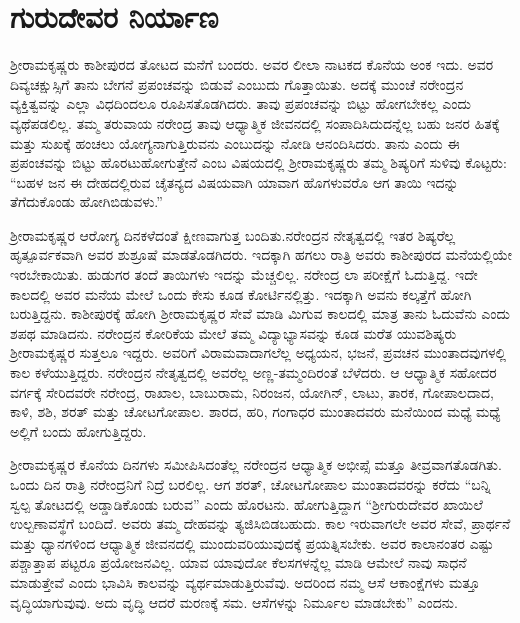 
\chapter{ಗುರುದೇವರ ನಿರ್ಯಾಣ}

ಶ‍್ರೀರಾಮಕೃಷ್ಣರು ಕಾಶೀಪುರದ ತೋಟದ ಮನೆಗೆ ಬಂದರು. ಅವರ ಲೀಲಾ ನಾಟಕದ ಕೊನೆಯ ಅಂಕ ಇದು. ಅವರ ದಿವ್ಯಚಕ್ಷುಸ್ಸಿಗೆ ತಾನು ಬೇಗನೆ ಪ್ರಪಂಚವನ್ನು ಬಿಡುವೆ ಎಂಬುದು ಗೊತ್ತಾಯಿತು. ಅದಕ್ಕೆ ಮುಂಚೆ ನರೇಂದ್ರನ ವ್ಯಕ್ತಿತ್ವವನ್ನು ಎಲ್ಲಾ ವಿಧದಿಂದಲೂ ರೂಪಿಸತೊಡಗಿದರು. ತಾವು ಪ್ರಪಂಚವನ್ನು ಬಿಟ್ಟು ಹೋಗಬೇಕಲ್ಲ ಎಂದು ವ್ಯಥೆಪಡಲಿಲ್ಲ. ತಮ್ಮ ತರುವಾಯ ನರೇಂದ್ರ ತಾವು ಆಧ್ಯಾತ್ಮಿಕ ಜೀವನದಲ್ಲಿ ಸಂಪಾದಿಸಿದುದನ್ನೆಲ್ಲ ಬಹು ಜನರ ಹಿತಕ್ಕೆ ಮತ್ತು ಸುಖಕ್ಕೆ ಹಂಚಲು ಯೋಗ್ಯನಾಗುತ್ತಿರುವನು ಎಂಬುದನ್ನು ನೋಡಿ ಆನಂದಿಸಿದರು. ತಾನು ಎಂದು ಈ ಪ್ರಪಂಚವನ್ನು ಬಿಟ್ಟು ಹೊರಟುಹೋಗುತ್ತೇನೆ ಎಂಬ ವಿಷಯದಲ್ಲಿ ಶ‍್ರೀರಾಮಕೃಷ್ಣರು ತಮ್ಮ ಶಿಷ್ಯರಿಗೆ ಸುಳಿವು ಕೊಟ್ಟರು: “ಬಹಳ ಜನ ಈ ದೇಹದಲ್ಲಿರುವ ಚೈತನ್ಯದ ವಿಷಯವಾಗಿ ಯಾವಾಗ ಹೊಗಳುವರೊ ಆಗ ತಾಯಿ ಇದನ್ನು ತೆಗೆದುಕೊಂಡು ಹೋಗಿಬಿಡುವಳು.”

\newpage

ಶ‍್ರೀರಾಮಕೃಷ್ಣರ ಆರೋಗ್ಯ ದಿನಕಳೆದಂತೆ ಕ್ಷೀಣವಾಗುತ್ತ ಬಂದಿತು.ನರೇಂದ್ರನ ನೇತೃತ್ವದಲ್ಲಿ ಇತರ ಶಿಷ್ಯರೆಲ್ಲ ಹೃತ್ಪೂರ್ವಕವಾಗಿ ಅವರ ಶುಶ್ರೂಷೆ ಮಾಡತೊಡಗಿದರು. ಇದಕ್ಕಾಗಿ ಹಗಲು ರಾತ್ರಿ ಅವರು ಕಾಶೀಪುರದ ಮನೆಯಲ್ಲಿಯೇ ಇರಬೇಕಾಯಿತು. ಹುಡುಗರ ತಂದೆ ತಾಯಿಗಳು ಇದನ್ನು ಮೆಚ್ಚಲಿಲ್ಲ. ನರೇಂದ್ರ ಲಾ ಪರೀಕ್ಷೆಗೆ ಓದುತ್ತಿದ್ದ. ಇದೇ ಕಾಲದಲ್ಲಿ ಅವರ ಮನೆಯ ಮೇಲೆ ಒಂದು ಕೇಸು ಕೂಡ ಕೋರ್ಟಿನಲ್ಲಿತ್ತು. ಇದಕ್ಕಾಗಿ ಅವನು ಕಲ್ಕತ್ತೆಗೆ ಹೋಗಿ ಬರುತ್ತಿದ್ದನು. ಕಾಶೀಪುರಕ್ಕೆ ಹೋಗಿ ಶ‍್ರೀರಾಮಕೃಷ್ಣರ ಸೇವೆ ಮಾಡಿ ಮಿಗುವ ಕಾಲದಲ್ಲಿ ಮಾತ್ರ ತಾನು ಓದುವೆನು ಎಂದು ಶಪಥ ಮಾಡಿದನು. ನರೇಂದ್ರನ ಕೋರಿಕೆಯ ಮೇಲೆ ತಮ್ಮ ವಿದ್ಯಾಭ್ಯಾಸವನ್ನು ಕೂಡ ಮರೆತ ಯುವಶಿಷ್ಯರು ಶ‍್ರೀರಾಮಕೃಷ್ಣರ ಸುತ್ತಲೂ ಇದ್ದರು. ಅವರಿಗೆ ವಿರಾಮವಾದಾಗಲೆಲ್ಲ ಅಧ್ಯಯನ, ಭಜನೆ, ಪ್ರವಚನ ಮುಂತಾದವುಗಳಲ್ಲಿ ಕಾಲ ಕಳೆಯುತ್ತಿದ್ದರು. ನರೇಂದ್ರನ ನೇತೃತ್ವದಲ್ಲಿ ಅವರೆಲ್ಲ ಅಣ್ಣ-ತಮ್ಮಂದಿರಂತೆ ಬೆಳೆದರು. ಆ ಆಧ್ಯಾತ್ಮಿಕ ಸಹೋದರ ವರ್ಗಕ್ಕೆ ಸೇರಿದವರೇ ನರೇಂದ್ರ, ರಾಖಾಲ, ಬಾಬುರಾಮ, ನಿರಂಜನ, ಯೋಗಿನ್, ಲಾಟು, ತಾರಕ, ಗೋಪಾಲದಾದ, ಕಾಳಿ, ಶಶಿ, ಶರತ್ ಮತ್ತು ಚೋಟಗೋಪಾಲ. ಶಾರದ, ಹರಿ, ಗಂಗಾಧರ ಮುಂತಾದವರು ಮನೆಯಿಂದ ಮಧ್ಯೆ ಮಧ್ಯೆ ಅಲ್ಲಿಗೆ ಬಂದು ಹೋಗುತ್ತಿದ್ದರು.

ಶ‍್ರೀರಾಮಕೃಷ್ಣರ ಕೊನೆಯ ದಿನಗಳು ಸಮೀಪಿಸಿದಂತೆಲ್ಲ ನರೇಂದ್ರನ ಆಧ್ಯಾತ್ಮಿಕ ಅಭೀಪ್ಸೆ ಮತ್ತೂ ತೀವ್ರವಾಗತೊಡಗಿತು. ಒಂದು ದಿನ ರಾತ್ರಿ ನರೇಂದ್ರನಿಗೆ ನಿದ್ರೆ ಬರಲಿಲ್ಲ. ಆಗ ಶರತ್, ಚೋಟಗೋಪಾಲ ಮುಂತಾದವರನ್ನು ಕರೆದು “ಬನ್ನಿ ಸ್ವಲ್ಪ ತೋಟದಲ್ಲಿ ಅಡ್ಡಾಡಿಕೊಂಡು ಬರುವ” ಎಂದು ಹೊರಟನು. ಹೋಗುತ್ತಿದ್ದಾಗ “ಶ‍್ರೀಗುರುದೇವರ ಖಾಯಿಲೆ ಉಲ್ಬಣಾವಸ್ಥೆಗೆ ಬಂದಿದೆ. ಅವರು ತಮ್ಮ ದೇಹವನ್ನು ತ್ಯಜಿಸಿಬಿಡಬಹುದು. ಕಾಲ ಇರುವಾಗಲೇ ಅವರ ಸೇವೆ, ಪ್ರಾರ್ಥನೆ ಮತ್ತು ಧ್ಯಾನಗಳಿಂದ ಆಧ್ಯಾತ್ಮಿಕ ಜೀವನದಲ್ಲಿ ಮುಂದುವರಿಯುವುದಕ್ಕೆ ಪ್ರಯತ್ನಿಸಬೇಕು. ಅವರ ಕಾಲಾನಂತರ ಎಷ್ಟು ಪಶ್ಚಾತ್ತಾಪ ಪಟ್ಟರೂ ಪ್ರಯೋಜನವಿಲ್ಲ. ಯಾವ ಯಾವುದೋ ಕೆಲಸಗಳನ್ನೆಲ್ಲ ಮಾಡಿ ಆಮೇಲೆ ನಾವು ಸಾಧನೆ ಮಾಡುತ್ತೇವೆ ಎಂದು ಭಾವಿಸಿ ಕಾಲವನ್ನು ವ್ಯರ್ಥಮಾಡುತ್ತಿರುವೆವು. ಅದರಿಂದ ನಮ್ಮ ಆಸೆ ಆಕಾಂಕ್ಷೆಗಳು ಮತ್ತೂ ವೃದ್ಧಿಯಾಗುವುವು. ಅದು ವೃದ್ಧಿ ಆದರೆ ಮರಣಕ್ಕೆ ಸಮ. ಆಸೆಗಳನ್ನು ನಿರ್ಮೂಲ ಮಾಡಬೇಕು” ಎಂದನು.

